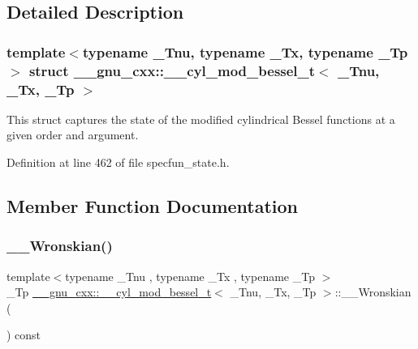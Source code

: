 \subsection{Detailed Description}
\subsubsection*{template$<$typename \+\_\+\+Tnu, typename \+\_\+\+Tx, typename \+\_\+\+Tp$>$\newline
struct \+\_\+\+\_\+gnu\+\_\+cxx\+::\+\_\+\+\_\+cyl\+\_\+mod\+\_\+bessel\+\_\+t$<$ \+\_\+\+Tnu, \+\_\+\+Tx, \+\_\+\+Tp $>$}

This struct captures the state of the modified cylindrical Bessel functions at a given order and argument. 

Definition at line 462 of file specfun\+\_\+state.\+h.



\subsection{Member Function Documentation}
\mbox{\label{struct____gnu__cxx_1_1____cyl__mod__bessel__t_a4e9bbc7f2cac91b245fda66b113fd5ac}} 
\subsubsection{\texorpdfstring{\+\_\+\+\_\+\+Wronskian()}{\_\_Wronskian()}}
{\footnotesize\ttfamily template$<$typename \+\_\+\+Tnu , typename \+\_\+\+Tx , typename \+\_\+\+Tp $>$ \\
\+\_\+\+Tp \hyperlink{struct____gnu__cxx_1_1____cyl__mod__bessel__t}{\+\_\+\+\_\+gnu\+\_\+cxx\+::\+\_\+\+\_\+cyl\+\_\+mod\+\_\+bessel\+\_\+t}$<$ \+\_\+\+Tnu, \+\_\+\+Tx, \+\_\+\+Tp $>$\+::\+\_\+\+\_\+\+Wronskian (\begin{DoxyParamCaption}{ }\end{DoxyParamCaption}) const\hspace{0.3cm}{\ttfamily [inline]}}



